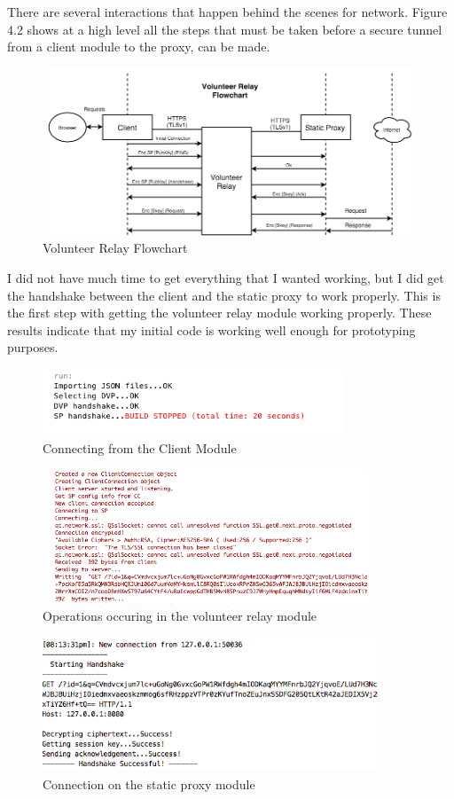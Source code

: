 \documentclass[12pt,a4paper]{report}
\begin{document}
There are several interactions that happen behind the scenes for network. Figure 4.2 shows at a high level all the steps that must be taken before a secure tunnel from a client module to the proxy, can be made. 
\begin{figure}[h]
	\caption{Volunteer Relay Flowchart}
	\includegraphics[width=13cm, height=5cm]{VolunteerRelay.png}
\end{figure}
I did not have much time to get everything that I wanted working, but I did get the handshake between the client and the static proxy to work properly. This is the first step with getting the volunteer relay module working properly. These results indicate that my initial code is working well enough for prototyping purposes. 
\begin{figure}[h]
	\caption{Connecting from the Client Module}
	\includegraphics[width=9cm, height=2cm]{client.png}
\end{figure}
\begin{figure}[h]
	\caption{Operations occuring in the volunteer relay module}
	\includegraphics[width=10cm, height=4cm]{dvp.png}
\end{figure}
 
 \begin{figure}[h]
 	\caption{Connection on the static proxy module}
 	\includegraphics[width=10cm, height=4cm]{SP.png}
 \end{figure}
 
\end{document}
